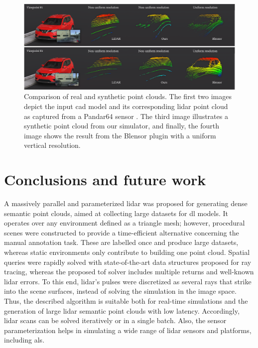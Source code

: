\begin{figure}
    \centering
    \includegraphics[width=\linewidth]{figs/lidar_simulation/lidar_point_cloud_comparison.png}
	\caption{Comparison of real and synthetic point clouds. The first two images depict the input \acrshort{cad} model and its corresponding \acrshort{lidar} point cloud as captured from a Pandar64 sensor \cite{hesai_pandaset_2021}. The third image illustrates a synthetic point cloud from our simulator, and finally, the fourth image shows the result from the Blensor plugin with a uniform vertical resolution. }
	\label{fig:lidar_point_cloud_comparison}
\end{figure}

\section{Conclusions and future work}

A massively parallel and parameterized \acrshort{lidar} was proposed for generating dense semantic point clouds, aimed at collecting large datasets for \acrshort{dl} models. It operates over any environment defined as a triangle mesh; however, procedural scenes were constructed to provide a time-efficient alternative concerning the manual annotation task. These are labelled once and produce large datasets, whereas static environments only contribute to building one point cloud. Spatial queries were rapidly solved with state-of-the-art data structures proposed for ray tracing, whereas the proposed \acrshort{tof} solver includes multiple returns and well-known \acrshort{lidar} errors. To this end, \acrshort{lidar}'s pulses were discretized as several rays that strike into the scene surfaces, instead of solving the simulation in the image space. Thus, the described algorithm is suitable both for real-time simulations and the generation of large \acrshort{lidar} semantic point clouds with low latency. Accordingly, \acrshort{lidar} scans can be solved iteratively or in a single batch. Also, the sensor parameterization helps in simulating a wide range of \acrshort{lidar} sensors and platforms, including \acrshort{als}.


